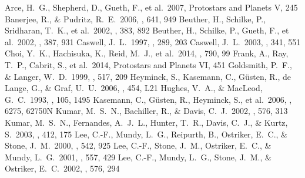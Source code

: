\documentclass[twocolumn]{aastex62}
\begin{document}








\begin{thebibliography}{}
 Arce, H.~G., Shepherd, D., Gueth, F., et al.\ 2007, Protostars and Planets V, 245 
 Banerjee, R., \& Pudritz, R.~E.\ 2006, \apj, 641, 949 
 Beuther, H., Schilke, P., Sridharan, T.~K., et al.\ 2002, \aap, 383, 892
 Beuther, H., Schilke, P., Gueth, F., et al.\ 2002, \aap, 387, 931 
 Caswell, J.~L.\ 1997, \mnras, 289, 203 
 Caswell, J.~L.\ 2003, \mnras, 341, 551 
 Choi, Y.~K., Hachisuka, K., Reid, M.~J., et al.\ 2014, \apj, 790, 99 
 Frank, A., Ray, T.~P., Cabrit, S., et al.\ 2014, Protostars and Planets VI, 451
 Goldsmith, P.~F., \& Langer, W.~D.\ 1999, \apj, 517, 209
 Heyminck, S., Kasemann, C., G{\"u}sten, R., de Lange, G., \& Graf, U.~U.\ 2006, \aap, 454, L21 
 Hughes, V.~A., \& MacLeod, G.~C.\ 1993, \aj, 105, 1495
 Kasemann, C., G{\"u}sten, R., Heyminck, S., et al.\ 2006, \procspie, 6275, 62750N 
 Kumar, M.~S.~N., Bachiller, R., \& Davis, C.~J.\ 2002, \apj, 576, 313 
 Kumar, M.~S.~N., Fernandes, A.~J.~L., Hunter, T.~R., Davis, C.~J., \& Kurtz, S.\ 2003, \aap, 412, 175 
 Lee, C.-F., Mundy, L.~G., Reipurth, B., Ostriker, E.~C., \& Stone, J.~M.\ 2000, \apj, 542, 925
 Lee, C.-F., Stone, J.~M., Ostriker, E.~C., \& Mundy, L.~G.\ 2001, \apj, 557, 429 
 Lee, C.-F., Mundy, L.~G., Stone, J.~M., \& Ostriker, E.~C.\ 2002, \apj, 576, 294 

\end{thebibliography}
\end{document}
